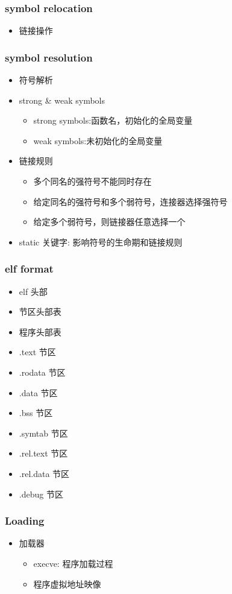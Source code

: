 \documentclass[a4paper, 11pt]{article}
\begin{document}
\subsubsection{symbol relocation}
\begin{itemize}
  \item{链接操作}
  \end{itemize}
\subsubsection{symbol resolution}
\begin{itemize}
  \item{符号解析}
  \item{strong \& weak symbols}
	\begin{itemize}
	\item{strong symbols:函数名，初始化的全局变量}
	\item{weak symbols:未初始化的全局变量}
	\end{itemize}
  \item{链接规则}
	\begin{itemize}
	  \item{多个同名的强符号不能同时存在}
	  \item{给定同名的强符号和多个弱符号，连接器选择强符号}
	  \item{给定多个弱符号，则链接器任意选择一个}
	  \end{itemize}
	\item{static 关键字: 影响符号的生命期和链接规则}
  \end{itemize}
\subsubsection{elf format}
\begin{itemize}
\item{elf 头部}
\item{节区头部表}
\item{程序头部表}
\item{.text 节区}
\item{.rodata 节区}
\item{.data 节区}
\item{.bss 节区}
\item{.symtab 节区}
\item{.rel.text 节区}
\item{.rel.data 节区}
\item{.debug 节区}
\end{itemize}
\subsubsection{Loading}
\begin{itemize}
\item{加载器}
  \begin{itemize}
	\item{execve: 程序加载过程}
	\item{程序虚拟地址映像}
	\end{itemize}
\end{itemize}
\end{document}
